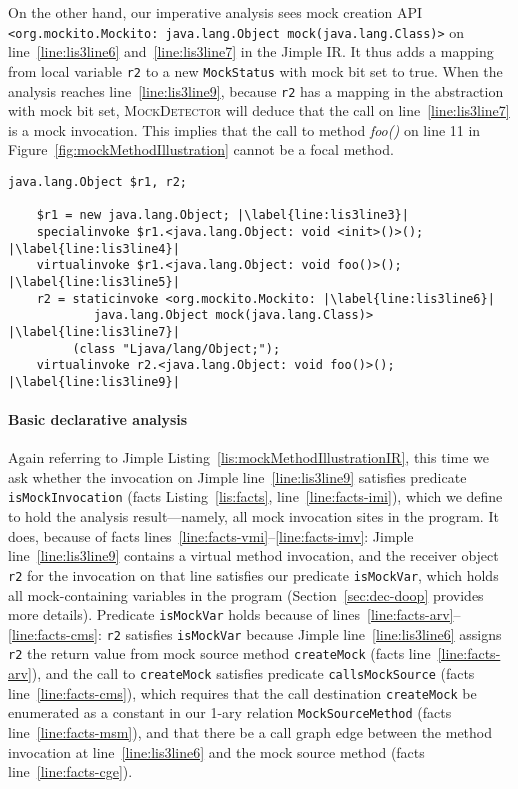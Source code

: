 On the other hand, our imperative analysis sees mock creation API \texttt{<org.mockito.Mockito: java.lang.Object mock(java.lang.Class)>} on line~\ref{line:lis3line6} and~\ref{line:lis3line7} in the Jimple IR. It thus adds a mapping from local variable \texttt{r2} to a new \texttt{MockStatus} with mock bit set to true. When the analysis reaches line~\ref{line:lis3line9}, because \texttt{r2} has a mapping in the abstraction with mock bit set, \textsc{MockDetector} will deduce that the call on line~\ref{line:lis3line7} is a mock invocation. This implies that the call to method \textit{foo()} on line 11 in Figure~\ref{fig:mockMethodIllustration} cannot be a focal method.


\begin{lstlisting}[basicstyle=\ttfamily, caption={Jimple Intermediate Representation for the code in Figure~\ref{fig:mockMethodIllustration}.},
basicstyle=\scriptsize\ttfamily, captionpos=b, label=lis:mockMethodIllustrationIR, escapechar=|, morekeywords={@Test, specialinvoke, virtualinvoke, staticinvoke}]
	java.lang.Object $r1, r2;
	
	$r1 = new java.lang.Object; |\label{line:lis3line3}|
	specialinvoke $r1.<java.lang.Object: void <init>()>(); |\label{line:lis3line4}|
	virtualinvoke $r1.<java.lang.Object: void foo()>(); |\label{line:lis3line5}|
	r2 = staticinvoke <org.mockito.Mockito: |\label{line:lis3line6}|
	        java.lang.Object mock(java.lang.Class)> |\label{line:lis3line7}|
	     (class "Ljava/lang/Object;");
	virtualinvoke r2.<java.lang.Object: void foo()>(); |\label{line:lis3line9}|
\end{lstlisting}

\paragraph{Basic declarative analysis} Again referring to Jimple Listing~\ref{lis:mockMethodIllustrationIR}, this time we ask whether the invocation on Jimple line~\ref{line:lis3line9} satisfies predicate \texttt{isMockInvocation} (facts Listing~\ref{lis:facts}, line~\ref{line:facts-imi}), which we define to hold the analysis result---namely, all mock invocation sites in the program. It does, because of facts lines~\ref{line:facts-vmi}--\ref{line:facts-imv}: Jimple line~\ref{line:lis3line9} contains a virtual method invocation, and the receiver object \texttt{r2} for the invocation on that line satisfies our predicate \texttt{isMockVar}, which holds all mock-containing variables in the program (Section~\ref{sec:dec-doop} provides more details). Predicate \texttt{isMockVar} holds because of lines~\ref{line:facts-arv}--\ref{line:facts-cms}: \texttt{r2} satisfies \texttt{isMockVar} because Jimple line~\ref{line:lis3line6} assigns \texttt{r2} the return value from mock source method \texttt{createMock} (facts line~\ref{line:facts-arv}), and the call to \texttt{createMock} satisfies predicate \texttt{callsMockSource} (facts line~\ref{line:facts-cms}), which requires that the call destination \texttt{createMock} be enumerated as a constant in our 1-ary relation \texttt{MockSourceMethod} (facts line~\ref{line:facts-msm}), and that there be a call graph edge between the method invocation at line~\ref{line:lis3line6} and the mock source method (facts line~\ref{line:facts-cge}).


